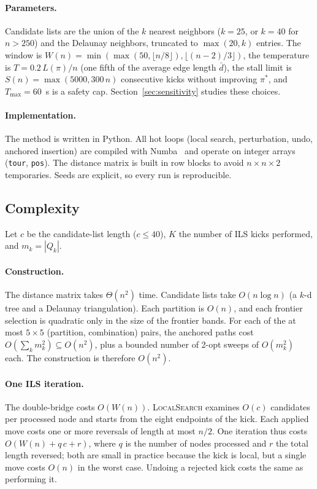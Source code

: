 \documentclass[runningheads]{llncs}
\begin{document}
\paragraph{Parameters.}
Candidate lists are the union of the $k$ nearest neighbors ($k=25$, or
$k=40$ for $n>250$) and the Delaunay neighbors, truncated to
$\max(20,k)$ entries. The window is
$W(n)=\min(\max(50,\lfloor n/8\rfloor),\lfloor(n-2)/3\rfloor)$, the
temperature is $T=0.2\,L(\pi)/n$ (one fifth of the average edge length
$\bar d$), the stall limit is $S(n)=\max(5000,300\,n)$ consecutive kicks
without improving $\pi^*$, and $T_{\max}=60$~s is a safety cap.
Section~\ref{sec:sensitivity} studies these choices.

\paragraph{Implementation.}
The method is written in Python. All hot loops (local search,
perturbation, undo, anchored insertion) are compiled with
Numba~\cite{lam2015numba} and operate on integer arrays (\texttt{tour},
\texttt{pos}). The distance matrix is built in row blocks to avoid
$n\times n\times 2$ temporaries. Seeds are explicit, so every run is
reproducible.

\subsection{Complexity}
\label{sec:complexity}

Let $c$ be the candidate-list length ($c\le 40$), $K$ the number of ILS
kicks performed, and $m_k=|Q_k|$.

\paragraph{Construction.} The distance matrix takes $\Theta(n^2)$ time.
Candidate lists take $O(n\log n)$ (a $k$-d tree and a Delaunay
triangulation). Each partition is $O(n)$, and each frontier selection is
quadratic only in the size of the frontier bands. For each of the at
most $5\times5$ (partition, combination) pairs, the anchored paths cost
$O(\sum_k m_k^2)\subseteq O(n^2)$, plus a bounded number of 2-opt sweeps
of $O(m_k^2)$ each. The construction is therefore $O(n^2)$.

\paragraph{One ILS iteration.} The double-bridge costs $O(W(n))$.
\textsc{LocalSearch} examines $O(c)$ candidates per processed node and
starts from the eight endpoints of the kick. Each applied move costs one
or more reversals of length at most $n/2$. One iteration thus costs
$O(W(n)+q\,c+r)$, where $q$ is the number of nodes processed and $r$ the
total length reversed; both are small in practice because the kick is
local, but a single move costs $O(n)$ in the worst case. Undoing a
rejected kick costs the same as performing it.
\end{document}
